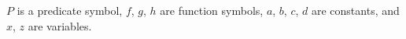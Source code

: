 $P$ is a predicate symbol, $f$, $g$, $h$ are function symbols, $a$, $b$, $c$, $d$ are constants, and $x$, $z$ are variables.
